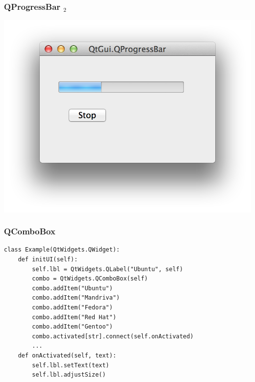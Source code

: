 \documentclass[utf8,compress]{beamer}
\begin{document}
\begin{frame}[fragile]
  \frametitle{QProgressBar $_2$}
\begin{center}
\includegraphics[scale=0.5]{pyqt15.png}
\end{center}
\end{frame}

\begin{frame}
  \frametitle{QComboBox}
\begin{verbatim}
class Example(QtWidgets.QWidget):
    def initUI(self):
        self.lbl = QtWidgets.QLabel("Ubuntu", self)
        combo = QtWidgets.QComboBox(self)
        combo.addItem("Ubuntu")
        combo.addItem("Mandriva")
        combo.addItem("Fedora")
        combo.addItem("Red Hat")
        combo.addItem("Gentoo")
        combo.activated[str].connect(self.onActivated)        
        ...
    def onActivated(self, text):
        self.lbl.setText(text)
        self.lbl.adjustSize()  
\end{verbatim}
\end{frame}
\end{document}
